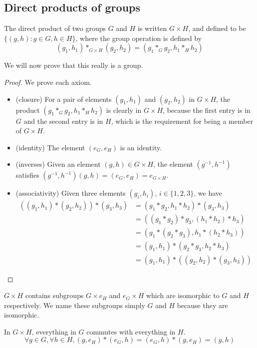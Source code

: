 \subsection{Direct products of groups}
\begin{definition}
	The direct product of two groups \(G\) and \(H\) is written \(G \times H\), and defined to be \(\{ (g, h) : g \in G, h \in H \}\), where the group operation is defined by
	\[
		(g_1, h_1) \ast_{G \times H} (g_2, h_2) = (g_1 \ast_G g_2, h_1 \ast_H h_2)
	\]
\end{definition}
We will now prove that this really is a group.
\begin{proof}
	We prove each axiom.
	\begin{itemize}
		\item (closure) For a pair of elements \((g_1, h_1)\) and \((g_2, h_2)\) in \(G \times H\), the product \((g_1 \ast_G g_2, h_1 \ast_H h_2)\) is clearly in \(G \times H\), because the first entry is in \(G\) and the second entry is in \(H\), which is the requirement for being a member of \(G \times H\).
		\item (identity) The element \((e_G, e_H)\) is an identity.
		\item (inverses) Given an element \((g, h) \in G \times H\), the element \((g^{-1}, h^{-1})\) satisfies \((g^{-1}, h^{-1})(g, h) = (e_G, e_H) = e_{G \times H}\).
		\item (associativity) Given three elements \((g_i, h_i)\), \(i \in \{1, 2, 3\}\), we have
		      \begin{align*}
			      ((g_1, h_1) \ast (g_2, h_2)) \ast (g_3, h_3) & = (g_1 \ast g_2, h_1 \ast h_2) \ast (g_3, h_3)       \\
			                                                   & = ((g_1 \ast g_2) \ast g_3, (h_1 \ast h_2) \ast h_3) \\
			                                                   & = (g_1 \ast (g_2 \ast g_3), h_1 \ast (h_2 \ast h_3)) \\
			                                                   & = (g_1, h_1) \ast (g_2 \ast g_3, h_2 \ast h_3)       \\
			                                                   & = (g_1, h_1) \ast ((g_2, h_2) \ast (g_3, h_3))
		      \end{align*}
	\end{itemize}
\end{proof}
\noindent \(G \times H\) contains subgroups \(G \times {e_H}\) and \({e_G} \times H\) which are isomorphic to \(G\) and \(H\) respectively.
We name these subgroups simply \(G\) and \(H\) because they are isomorphic.
\begin{note}
	In \(G \times H\), everything in \(G\) commutes with everything in \(H\).
	\[
		\forall g \in G, \forall h \in H, (g, e_H) \ast (e_G, h) = (e_G, h) \ast (g, e_H) = (g, h)
	\]
\end{note}

